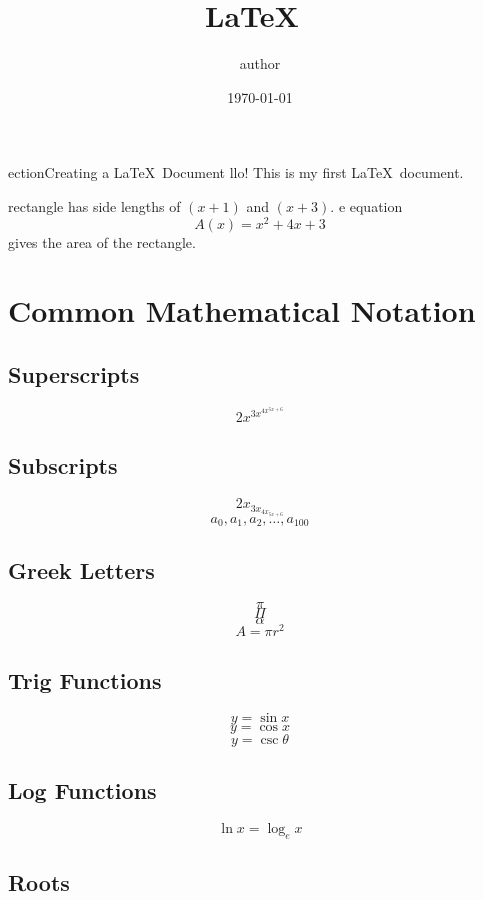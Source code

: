 \documentclass[11pt, a4paper]{article}
\title{ \LaTeX\ }
\author{author}
\date{\today}
\begin{document}
\maketitle
\thispagestyle{empty}
\pagebreak

\tableofcontents
\pagebreak
{}

\pagestyle{fancy}
\fancyhead[L]{ \LaTeX\ }
\fancyhead[R]{\nouppercase{\leftmark}}

ection{Creating a \LaTeX\ Document}
llo! This is my first \LaTeX\ document.

rectangle has side lengths of $(x + 1)$ and $(x + 3)$.
e equation $${A(x) = x^2 + 4x + 3}$$ gives the area of the rectangle.

\section{Common Mathematical Notation}

\subsection{Superscripts}

$$ 2x^{3x^{4x^{5x+6}}} $$

\subsection{Subscripts}

$$ 2x_{3x_{4x_{5x+6}}} $$
$$ a_0, a_1, a_2, \ldots, a_{100} $$

\subsection{Greek Letters}

$$ \pi $$
$$ \Pi $$
$$ \alpha $$
$$ A = \pi r^2 $$

\subsection{Trig Functions}

$$ y = \sin x $$
$$ y = \cos x $$
$$ y = \csc \theta $$

\subsection{Log Functions}

$$ \ln x = \log_e x $$

\subsection{Roots}
\end{document}
